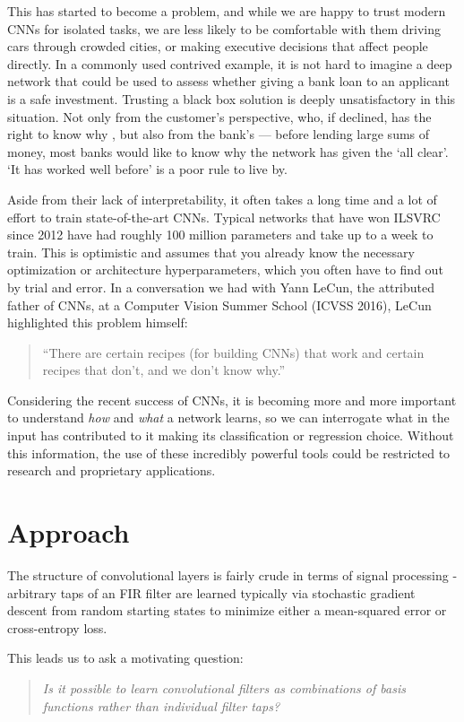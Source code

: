 This has started to become a problem, and while we are happy to trust modern
CNNs for isolated tasks, we are less likely to be comfortable with them driving
cars through crowded cities, or making executive decisions that affect people
directly. In a commonly used contrived example, it is not hard to imagine a deep
network that could be used to assess whether giving a bank loan to an applicant
is a safe investment. Trusting a black box solution is deeply unsatisfactory in
this situation. Not only from the customer's perspective, who, if declined, has
the right to know why \cite{goodman_european_2017-1}, but
also from the bank's --- before lending large sums of money, most banks
would like to know why the network has given the `all clear'. `It has worked well
before' is a poor rule to live by.

Aside from their lack of interpretability, it often takes a long time and a lot of
effort to train state-of-the-art CNNs. Typical networks that have won ILSVRC
since 2012 have had roughly 100 million parameters and take up to a week to train. This
is optimistic and assumes that you already know the necessary optimization or
architecture hyperparameters, which you often have to find out by trial and error.
In a conversation we had with Yann LeCun, the attributed father of
CNNs, at a Computer Vision Summer School (ICVSS 2016), LeCun highlighted this problem
himself:
\begin{quote}
  ``There are certain recipes (for building CNNs) that work and certain recipes
  that don't, and we don't know why.''
\end{quote}

Considering the recent success of CNNs, it is becoming more and more
important to understand \emph{how} and \emph{what} a network learns, so we can
interrogate what in the input has contributed to it making its classification or regression choice.
Without this information, the use of these incredibly powerful tools could be
restricted to research and proprietary applications.

\section{Approach}
The structure of convolutional layers is fairly crude in terms of signal
processing - arbitrary taps of an FIR filter are learned typically via
stochastic gradient descent from random starting states to minimize either a
mean-squared error or cross-entropy loss.

This leads us to ask a motivating question:
%
\begin{quote}
    \emph{Is it possible to learn convolutional filters as combinations of basis
    functions rather than individual filter taps?}
\end{quote}


